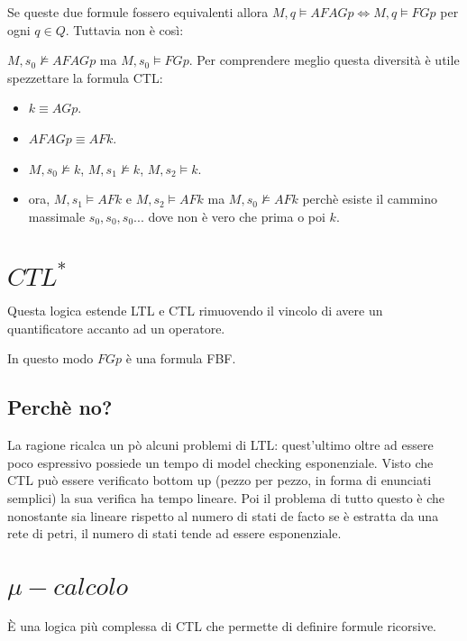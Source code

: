 Se queste due formule fossero equivalenti allora $M,q \models AFAGp \Leftrightarrow M,q \models FGp$ per ogni $q \in Q$. Tuttavia non \`e cos\`i:


$M,s_0 \not \models AFAGp $ ma $ M,s_0 \models FGp$. Per comprendere meglio questa diversit\`a \`e utile spezzettare la formula CTL:

\begin{itemize}
  \item $k \equiv AGp$.
  \item $AFAGp \equiv AFk$.
  \item $M,s_0 \not \models k$, $M,s_1 \not \models k$, $M,s_2 \models k$.
  \item ora, $M,s_1 \models AFk$ e $M,s_2 \models AFk$ ma $M,s_0 \not \models AFk$ perch\`e esiste il cammino massimale $s_0,s_0,s_0...$ dove non \`e vero che prima o poi $k$.
\end{itemize}

\section{$CTL^\ast$}

Questa logica estende LTL e CTL rimuovendo il vincolo di avere un quantificatore accanto ad un operatore.


In questo modo $FGp$ \`e una formula FBF.

\subsection{Perch\`e no?}

La ragione ricalca un p\`o alcuni problemi di LTL: quest'ultimo oltre ad essere poco espressivo possiede un tempo di model checking esponenziale. Visto che CTL pu\`o essere verificato bottom up (pezzo per pezzo, in forma di enunciati semplici) la sua verifica ha tempo lineare.
Poi il problema di tutto questo \`e che nonostante sia lineare rispetto al numero di stati de facto se \`e estratta da una rete di petri, il numero di stati tende ad essere esponenziale.

\section{$\mu-calcolo$}

\`E una logica pi\`u complessa di CTL che permette di definire formule ricorsive.

